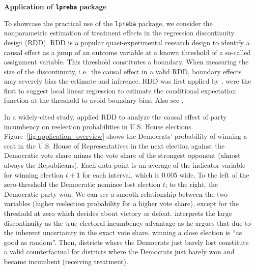 \documentclass[a4paper, 12pt]{scrartcl}
\begin{document}
\begin{center}
	\textsf{\textbf{\Large Application of \texttt{lpreba} package}}
\end{center}
\noindent
To showcase the practical use of the \texttt{lpreba} package,
we consider the nonparametric estimation of treatment effects in the regression discontinuity design (RDD).
RDD is a popular quasi-experimental research design to identify a causal effect
as a jump of an outcome variable at a known threshold of a so-called assignment variable.
This threshold constitutes a boundary.
When measuring the size of the discontinuity, i.e.\ the causal effect in a valid RDD,
boundary effects may severely bias the estimate and inference.
RDD was first applied by \textcite{Thistlethwaite_1960}.
\textcite{Hahn_2001} were the first to suggest local linear regression to estimate the conditional expectation function
at the threshold to avoid boundary bias.
Also see \textcite{Porter_2003}.

In a widely-cited study, \textcite{Lee_2008} applied RDD to analyze the causal effect of party incumbency
on reelection probabilities in U.S. House elections.
Figure~\ref{fig:application_overview} shows the Democrats' probability of winning a seat in the U.S. House of Representatives
in the next election against the Democratic vote share minus the vote share of the strongest opponent
(almost always the Republicans).
Each data point is an average of the indicator variable for winning election $t+1$ for each interval, which is 0.005 wide.
To the left of the zero-threshold the Democratic nominee lost election $t$;
to the right, the Democratic party won.
We can see a smooth relationship between the two variables (higher reelection probability for a higher vote share),
except for the threshold at zero which decides about victory or defeat.
\textcite{Lee_2008} interprets the large discontinuity as the true electoral incumbency advantage
as he argues that due to the inherent uncertainty in the exact vote share,
winning a close election is ``as good as random''.
Then, districts where the Democrats just barely lost constitute a valid counterfactual for districts
where the Democrats just barely won and became incumbent (receiving treatment).
\end{document}
